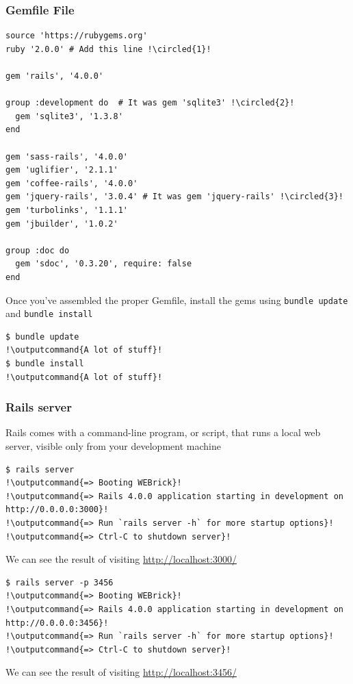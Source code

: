 \documentclass{beamer}
\newcommand*\circled[1]{\tikz[baseline=(char.base)]{
            \node[shape=circle,draw,inner sep=2pt] (char) {#1};}}
\newcommand{\commandinline}[1]{\lstinline[basicstyle=\small\lstfontfamily]{#1}}
\newcommand{\outputcommand}[1]{\color{darkgreen}{#1}}
\begin{document}
\begin{frame}
\frametitle{Gemfile File}
\lstset{language=Ruby, style=eclipse}
\begin{lstlisting}[caption=A new Gemfile with an explicit version for each Ruby gem, escapechar=!]
source 'https://rubygems.org'
ruby '2.0.0' # Add this line !\circled{1}!

gem 'rails', '4.0.0'

group :development do  # It was gem 'sqlite3' !\circled{2}!
  gem 'sqlite3', '1.3.8'
end

gem 'sass-rails', '4.0.0'
gem 'uglifier', '2.1.1'
gem 'coffee-rails', '4.0.0'
gem 'jquery-rails', '3.0.4' # It was gem 'jquery-rails' !\circled{3}!
gem 'turbolinks', '1.1.1'
gem 'jbuilder', '1.0.2'

group :doc do
  gem 'sdoc', '0.3.20', require: false
end
\end{lstlisting}
Once you’ve assembled the proper Gemfile, install the gems using \commandinline{bundle update} and \commandinline{bundle install}
\lstset{language=shell}
\begin{lstlisting}[escapechar=!]
$ bundle update
!\outputcommand{A lot of stuff}!
$ bundle install
!\outputcommand{A lot of stuff}!
\end{lstlisting}
\end{frame}
\begin{frame}[fragile]
\frametitle{Rails server}
Rails comes with a command-line program, or script, that runs a local web server, visible only from your development machine
\lstset{language=shell}
\begin{lstlisting}[escapechar=!]
$ rails server
!\outputcommand{=> Booting WEBrick}!
!\outputcommand{=> Rails 4.0.0 application starting in development on http://0.0.0.0:3000}!
!\outputcommand{=> Run `rails server -h` for more startup options}!
!\outputcommand{=> Ctrl-C to shutdown server}!
\end{lstlisting}
We can see the result of visiting \url{http://localhost:3000/}
\begin{lstlisting}[escapechar=!]
$ rails server -p 3456
!\outputcommand{=> Booting WEBrick}!
!\outputcommand{=> Rails 4.0.0 application starting in development on http://0.0.0.0:3456}!
!\outputcommand{=> Run `rails server -h` for more startup options}!
!\outputcommand{=> Ctrl-C to shutdown server}!
\end{lstlisting}
We can see the result of visiting \url{http://localhost:3456/}
\end{frame}
\end{document}
